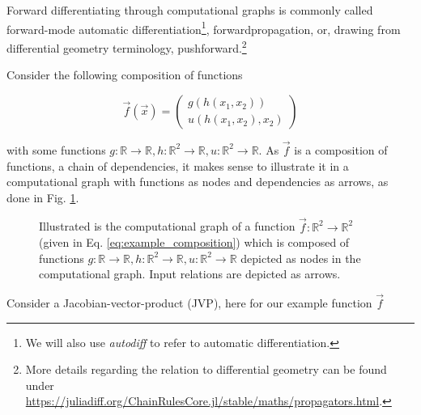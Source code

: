 Forward differentiating through computational graphs is commonly called forward-mode
automatic differentiation\footnote{We will also use \textit{autodiff} to refer to automatic differentiation.}, forwardpropagation, or, drawing from differential geometry
terminology, pushforward.\footnote{More details regarding the relation to
differential geometry can be found under \href{https://juliadiff.org/ChainRulesCore.jl/stable/maths/propagators.html}{https://juliadiff.org/ChainRulesCore.jl/stable/maths/propagators.html}.}



Consider the following composition of functions

\begin{equation}
    \vec{f}(\vec{x}) = 
    \begin{pmatrix}
        g(h(x_1,x_2)) \\
        u(h(x_1, x_2), x_2)
    \end{pmatrix}
    \label{eq:example_composition}
\end{equation}

with some functions $g: \mathbb{R} \rightarrow \mathbb{R}, h: \mathbb{R}^2 \rightarrow \mathbb{R}, u: \mathbb{R}^2 \rightarrow \mathbb{R}$.
As $\vec{f}$ is a composition of functions, a chain of dependencies,
it makes sense to illustrate it in a computational graph with functions as nodes and dependencies
as arrows, as done in Fig. \ref{fig:comp_graph_diff}.

\begin{figure}[!htb]
 \centering
 \hfill
 \caption{Illustrated is the computational graph of a function $\vec{f}: \mathbb{R}^2 \rightarrow \mathbb{R}^2$ (given in Eq. \ref{eq:example_composition})
 which is composed of functions $g: \mathbb{R} \rightarrow \mathbb{R}, h: \mathbb{R}^2 \rightarrow \mathbb{R}, u: \mathbb{R}^2 \rightarrow \mathbb{R}$
 depicted as nodes in the computational graph. Input relations are depicted as arrows.}
 \label{fig:comp_graph_diff}
\end{figure}

Consider a Jacobian-vector-product (JVP), here for our example function $\vec{f}$

